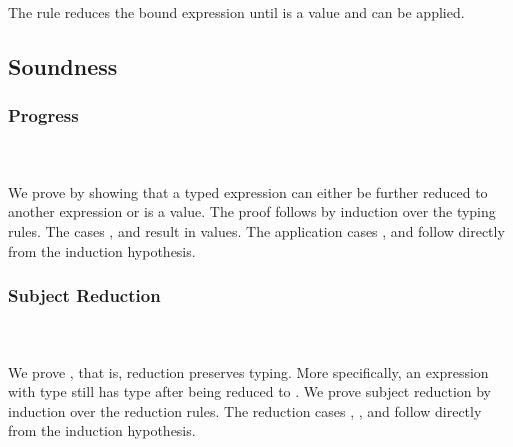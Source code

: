 \noindent The rule  reduces the bound expression  until  is a value and  can be applied. 

\subsection{Soundness}

\subsubsection{Progress}\hfill\\\\
We prove  by showing that a typed expression  can either be further reduced to another expression  or  is a value. 
The proof follows by induction over the typing rules. 
\FProgress
The cases ,  and  result in values. 
The application cases ,  and  follow directly from the induction hypothesis. 
\subsubsection{Subject Reduction}\hfill\\\\
We prove , that is, reduction preserves typing. 
More specifically, an expression  with type  still has type  after being reduced to . 
We prove subject reduction by induction over the reduction rules. 
\FSubjectReduction
The  reduction cases , ,  and  follow directly from the induction hypothesis. 

